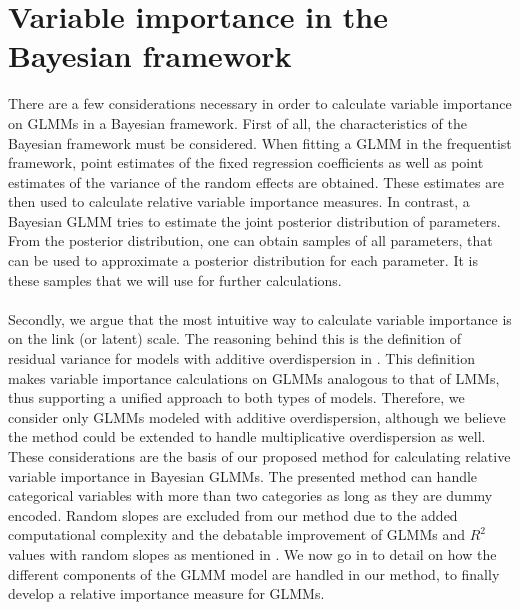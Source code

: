 \section{Variable importance in the Bayesian framework}
There are a few considerations necessary in order to calculate variable importance on GLMMs in a Bayesian framework. First of all, the characteristics of the Bayesian framework must be considered. When fitting a GLMM in the frequentist framework, point estimates of the fixed regression coefficients as well as point estimates of the variance of the random effects are obtained. These estimates are then used to calculate relative variable importance measures. In contrast, a Bayesian GLMM tries to estimate the joint posterior distribution of parameters. From the posterior distribution, one can obtain samples of all parameters, that can be used to approximate a posterior distribution for each parameter. It is these samples that we will use for further calculations.
\\
\\
Secondly, we argue that the most intuitive way to calculate variable importance is on the link (or latent) scale. The reasoning behind this is the definition of residual variance for models with additive overdispersion in \citet{nakagawa2013general}. This definition makes variable importance calculations on GLMMs analogous to that of LMMs, thus supporting a unified approach to both types of models. Therefore, we consider only GLMMs modeled with additive overdispersion, although we believe the method could be extended to handle multiplicative overdispersion as well.
These considerations are the basis of our proposed method for calculating relative variable importance in Bayesian GLMMs.
The presented method can handle categorical variables with more than two categories as long as they are dummy encoded. Random slopes are excluded from our method due to the added computational complexity and the debatable improvement of GLMMs and $R^2$ values with random slopes as mentioned in \citet{Johnson2014}.
We now go in to detail on how the different components of the GLMM model are handled in our method, to finally develop a relative importance measure for GLMMs.

